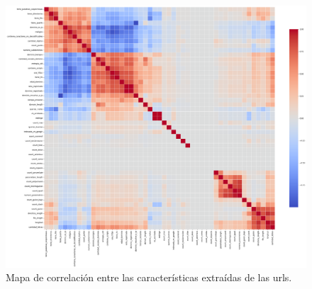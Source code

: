 \begin{figure}[H]
    \centering
    \includegraphics[width=\textwidth]{heatmap.png}
    \caption{Mapa de correlación entre las características extraídas de las \glspl{url}.}
    \label{fig:correlation_matrix}
\end{figure}











